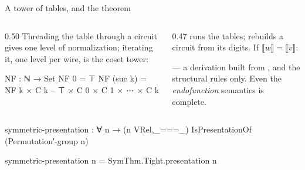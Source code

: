 \begin{frame}{A tower of tables, and the theorem}
\begin{columns}[c]
\begin{column}{0.50\textwidth}
Threading the table through a circuit gives one level of normalization;
iterating it, one level per wire, is the \alert{coset tower}:
\begin{code}
NF : ℕ → Set
NF 0       = ⊤
NF (suc k) = NF k × C k   -- ⊤ × C 0 × C 1 × ⋯ × C k
\end{code}
\vspace{2pt}
\centering
{}
\end{column}
\begin{column}{0.47\textwidth}
\small{} runs the tables;  rebuilds a circuit from its digits.
If $\llbracket w\rrbracket = \llbracket v\rrbracket$:
\begin{center}
\end{center}
--- a derivation built from ,  and the structural
rules only. Even the \emph{endofunction} semantics is complete.
\end{column}
\end{columns}
\vspace{6pt}
\begin{code}
symmetric-presentation : ∀ n → (n VRel,_===_) IsPresentationOf (Permutation′-group n)
\end{code}
\begin{code}[hide]
symmetric-presentation n = SymThm.Tight.presentation n
\end{code}
\end{frame}
